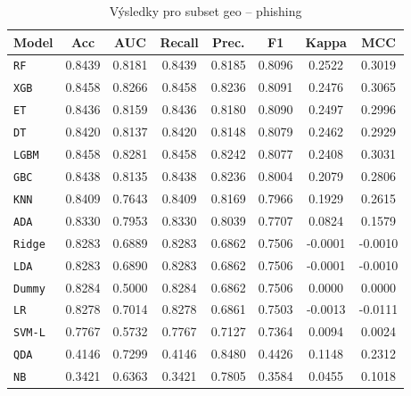 \begin{table}[H]
  \centering
  \small
  \caption{Výsledky pro subset geo – phishing}
  \begin{tabular}{|l|c|c|c|c|c|c|c|}
    \hline
    \textbf{Model} & \textbf{Acc} & \textbf{AUC} & \textbf{Recall} & \textbf{Prec.} & \textbf{F1} & \textbf{Kappa} & \textbf{MCC} \\
    \hline
    \texttt{RF} & 0.8439 & 0.8181 & 0.8439 & 0.8185 & 0.8096 & 0.2522 & 0.3019 \\
    \texttt{XGB} & 0.8458 & 0.8266 & 0.8458 & 0.8236 & 0.8091 & 0.2476 & 0.3065 \\
    \texttt{ET} & 0.8436 & 0.8159 & 0.8436 & 0.8180 & 0.8090 & 0.2497 & 0.2996 \\
    \texttt{DT} & 0.8420 & 0.8137 & 0.8420 & 0.8148 & 0.8079 & 0.2462 & 0.2929 \\
    \texttt{LGBM} & 0.8458 & 0.8281 & 0.8458 & 0.8242 & 0.8077 & 0.2408 & 0.3031 \\
    \texttt{GBC} & 0.8438 & 0.8135 & 0.8438 & 0.8236 & 0.8004 & 0.2079 & 0.2806 \\
    \texttt{KNN} & 0.8409 & 0.7643 & 0.8409 & 0.8169 & 0.7966 & 0.1929 & 0.2615 \\
    \texttt{ADA} & 0.8330 & 0.7953 & 0.8330 & 0.8039 & 0.7707 & 0.0824 & 0.1579 \\
    \texttt{Ridge} & 0.8283 & 0.6889 & 0.8283 & 0.6862 & 0.7506 & -0.0001 & -0.0010 \\
    \texttt{LDA} & 0.8283 & 0.6890 & 0.8283 & 0.6862 & 0.7506 & -0.0001 & -0.0010 \\
    \texttt{Dummy} & 0.8284 & 0.5000 & 0.8284 & 0.6862 & 0.7506 & 0.0000 & 0.0000 \\
    \texttt{LR} & 0.8278 & 0.7014 & 0.8278 & 0.6861 & 0.7503 & -0.0013 & -0.0111 \\
    \texttt{SVM-L} & 0.7767 & 0.5732 & 0.7767 & 0.7127 & 0.7364 & 0.0094 & 0.0024 \\
    \texttt{QDA} & 0.4146 & 0.7299 & 0.4146 & 0.8480 & 0.4426 & 0.1148 & 0.2312 \\
    \texttt{NB} & 0.3421 & 0.6363 & 0.3421 & 0.7805 & 0.3584 & 0.0455 & 0.1018 \\
    \hline
  \end{tabular}
\end{table}
\vspace{0.5cm}

